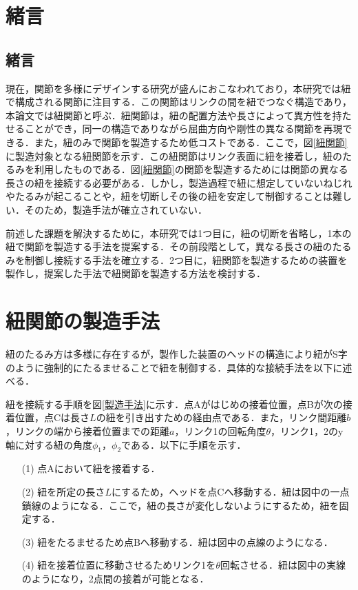 \section{緒言}
\subsection{緒言}
現在，関節を多様にデザインする研究が盛んにおこなわれており，本研究では紐で構成される関節に注目する．この関節はリンクの間を紐でつなぐ構造であり，本論文では紐関節と呼ぶ．紐関節は，紐の配置方法や長さによって異方性を持たせることができ，同一の構造でありながら屈曲方向や剛性の異なる関節を再現できる．また，紐のみで関節を製造するため低コストである．ここで，図\ref{紐関節}に製造対象となる紐関節を示す．この紐関節はリンク表面に紐を接着し，紐のたるみを利用したものである．図\ref{紐関節}の関節を製造するためには関節の異なる長さの紐を接続する必要がある．しかし，製造過程で紐に想定していないねじれやたるみが起こることや，紐を切断しその後の紐を安定して制御することは難しい．そのため，製造手法が確立されていない\cite{山本圭治郎2012}．
\par
前述した課題を解決するために，本研究では1つ目に，紐の切断を省略し，1本の紐で関節を製造する手法を提案する．その前段階として，異なる長さの紐のたるみを制御し接続する手法を確立する．2つ目に，紐関節を製造するための装置を製作し，提案した手法で紐関節を製造する方法を検討する．

\section{紐関節の製造手法}
紐のたるみ方は多様に存在するが，製作した装置のヘッドの構造により紐がS字のように強制的にたるませることで紐を制御する．具体的な接続手法を以下に述べる．
\par
紐を接続する手順を図\ref{製造手法}に示す．点Aがはじめの接着位置，点Bが次の接着位置，点Cは長さ$L$の紐を引き出すための経由点である．また，リンク間距離$b$，リンクの端から接着位置までの距離$a$，リンク1の回転角度$\theta$，リンク1，2のy軸に対する紐の角度$\phi_1$，$\phi_2$である．以下に手順を示す．
\begin{itemize}
  \setlength{\itemsep}{-5pt}
  \item[(1)]点Aにおいて紐を接着する．
  \item[(2)]紐を所定の長さ$L$にするため，ヘッドを点Cへ移動する．紐は図中の一点鎖線のようになる．ここで，紐の長さが変化しないようにするため，紐を固定する．
  \item[(3)]紐をたるませるため点Bへ移動する．紐は図中の点線のようになる．
  \item[(4)]紐を接着位置に移動させるためリンク1を$\theta$回転させる．紐は図中の実線のようになり，2点間の接着が可能となる．
\end{itemize}

